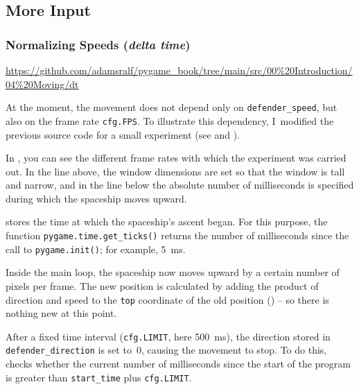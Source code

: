 \newpage
\subsection{More Input}
\subsubsection{Normalizing Speeds (\emph{delta time})}\label{secDeltatime}
\begin{diskbox}
	\url{https://github.com/adamsralf/pygame_book/tree/main/src/00%20Introduction/04%20Moving/dt}
\end{diskbox}

At the moment, the movement does not depend only on
\texttt{defender\_speed}, but also on the frame rate
\texttt{cfg.FPS}.
To illustrate this dependency, I~modified the previous source code for a small experiment (see  and ).


In , you can see the different frame rates with which the experiment was carried out. In the line above, the window dimensions are set so that the window is tall and narrow, and in the line below the absolute number of milliseconds is specified during which the spaceship moves upward.


 stores the time at which the spaceship’s ascent began. For this purpose, the function \texttt{pygame.time.get\_ticks()} returns the number of milliseconds since the call to \texttt{pygame.init()}; for example, \SI{5}{ms}.

Inside the main loop, the spaceship now moves upward by a certain number of pixels per frame. The new position is calculated by adding the product of direction and speed to the \texttt{top} coordinate of the old position () -- so there is nothing new at this point.

After a fixed time interval (\texttt{cfg.LIMIT}, here \SI{500}{ms}), the direction stored in \texttt{defender\-\_direction} is set to~0, causing the movement to stop. To do this,  checks whether the current number of milliseconds since the start of the program is greater than \texttt{start\_time} plus \texttt{cfg.LIMIT}. 


